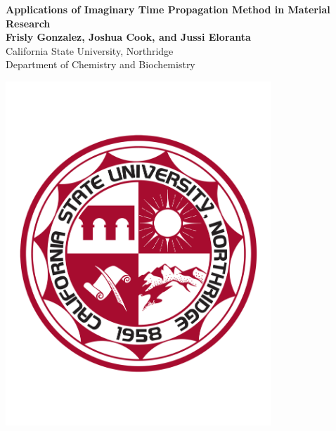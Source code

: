 \documentclass[a0b,landscape]{a0poster}
\begin{document}


\begin{minipage}[b]{0.80\linewidth}
\veryHuge \color{Red} \textbf{Applications of Imaginary Time Propagation Method in Material Research} \color{Black}\\ %
\huge \textbf{Frisly Gonzalez, Joshua Cook, and Jussi Eloranta}\\ %
\huge California State University, Northridge\\ Department of Chemistry and Biochemistry
\end{minipage}
%
%
\begin{minipage}[b]{0.19\linewidth}
\includegraphics[width=10cm]{CSUNSeal.pdf} %
\end{minipage}
\end{document}
